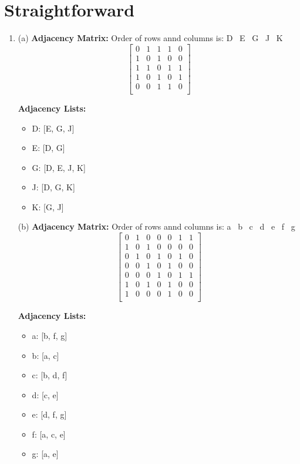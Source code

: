 \documentclass[a4paper]{article}
\begin{document}
\section{Straightforward}
\begin{enumerate}
    \item (a) \textbf{Adjacency Matrix:}
    Order of rows annd columns is: D \ E \ G \ J \ K
        $$
        \begin{bmatrix}
            0 & 1 & 1 & 1 & 0 \\
            1 & 0 & 1 & 0 & 0 \\
            1 & 1 & 0 & 1 & 1 \\
            1 & 0 & 1 & 0 & 1 \\
            0 & 0 & 1 & 1 & 0 \\
        \end{bmatrix}
        $$

    \textbf{Adjacency Lists:}
    \begin{itemize}
        \item D: [E, G, J]
        \item E: [D, G]
        \item G: [D, E, J, K]
        \item J: [D, G, K]
        \item K: [G, J]
    \end{itemize}


    (b) \textbf{Adjacency Matrix:}
    Order of rows annd columns is: a \ b \ c \ d \ e \ f \ g
        $$
        \begin{bmatrix}
            0 & 1 & 0 & 0 & 0 & 1 & 1 \\
            1 & 0 & 1 & 0 & 0 & 0 & 0 \\
            0 & 1 & 0 & 1 & 0 & 1 & 0 \\
            0 & 0 & 1 & 0 & 1 & 0 & 0 \\
            0 & 0 & 0 & 1 & 0 & 1 & 1 \\
            1 & 0 & 1 & 0 & 1 & 0 & 0 \\
            1 & 0 & 0 & 0 & 1 & 0 & 0 \\
        \end{bmatrix}
        $$

    \textbf{Adjacency Lists:}
    \begin{itemize}
        \item a: [b, f, g]
        \item b: [a, c]
        \item c: [b, d, f]
        \item d: [c, e]
        \item e: [d, f, g]
        \item f: [a, c, e]
        \item g: [a, e]
    \end{itemize}


\end{enumerate}
\end{document}

